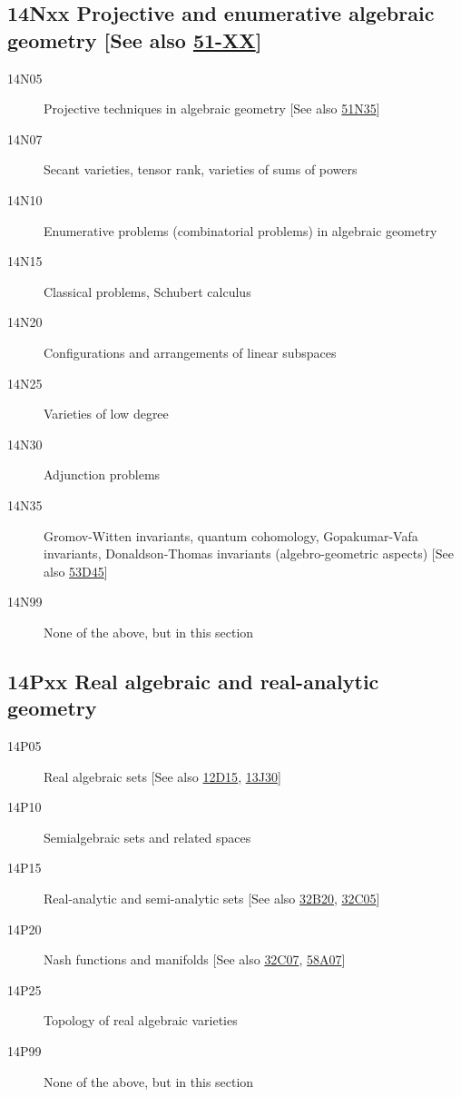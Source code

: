 \subsection*{14Nxx Projective and enumerative algebraic geometry [See also \hyperref[51-XX]{51-XX}] }\label{14Nxx}
\begin{description}               
\item [14N05]\label{14N05} Projective techniques in algebraic geometry [See also \hyperref[51N35]{51N35}]
\item [14N07]\label{14N07} Secant varieties, tensor rank, varieties of sums of powers
\item [14N10]\label{14N10} Enumerative problems (combinatorial problems) in algebraic geometry
\item [14N15]\label{14N15} Classical problems, Schubert calculus
\item [14N20]\label{14N20} Configurations and arrangements of linear subspaces
\item [14N25]\label{14N25} Varieties of low degree
\item [14N30]\label{14N30} Adjunction problems
\item [14N35]\label{14N35} Gromov-Witten invariants, quantum cohomology, Gopakumar-Vafa invariants, Donaldson-Thomas invariants (algebro-geometric aspects) [See also \hyperref[53D45]{53D45}]
\item [14N99]\label{14N99} None of the above, but in this section
\end{description}          
\subsection*{14Pxx Real algebraic and real-analytic geometry }\label{14Pxx}
\begin{description}               
\item [14P05]\label{14P05} Real algebraic sets [See also \hyperref[12D15]{12D15}, \hyperref[13J30]{13J30}]
\item [14P10]\label{14P10} Semialgebraic sets and related spaces
\item [14P15]\label{14P15} Real-analytic and semi-analytic sets [See also \hyperref[32B20]{32B20}, \hyperref[32C05]{32C05}]
\item [14P20]\label{14P20} Nash functions and manifolds [See also \hyperref[32C07]{32C07}, \hyperref[58A07]{58A07}]
\item [14P25]\label{14P25} Topology of real algebraic varieties
\item [14P99]\label{14P99} None of the above, but in this section
\end{description}          
